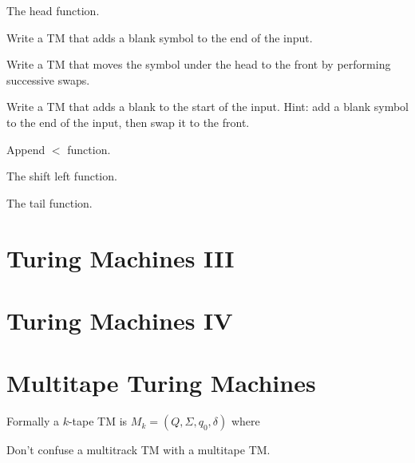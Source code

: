 \frmrule

\begin{example}
The head function. 


\end{example}

\frmrule

\begin{example}
Write a TM that adds a blank symbol to the end of the input.
\end{example}

\begin{example}
Write a TM that moves the symbol under the head 
to the front by performing successive swaps. 
\end{example}

\begin{example}
Write a TM that adds a blank to the start of the input. 
Hint: add a blank symbol to the end of the input, then 
swap it to the front. 
\end{example}

\begin{example}
Append $<$ function. 
\end{example}

\frmrule

\begin{example}
The shift left function. 
\end{example}
\begin{example}
The tail function. 
\end{example}



\section{Turing Machines III}

\section{Turing Machines IV}

\section{Multitape Turing Machines}


Formally a $k$-tape TM is $M_k = (Q,\Sigma,q_0,\delta)$ 
where 

Don't confuse a multitrack TM with a multitape TM. 

